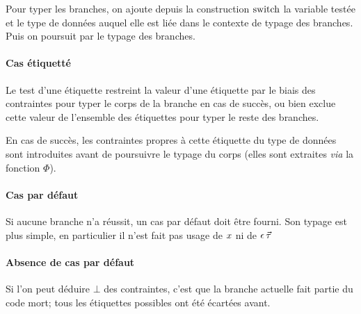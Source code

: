 \begin{mathpar}
%



%
\end{mathpar}
%
Pour typer les branches, on ajoute depuis la construction $\kw{switch}$
la variable testée et le type de données auquel elle est liée dans le contexte
de typage des branches. Puis on poursuit par le typage des branches. 

\paragraph{Cas étiquetté} Le test d'une étiquette restreint la valeur
d'une étiquette par le biais des contraintes pour typer le corps de la branche
en cas de succès, ou bien exclue cette valeur de l'ensemble des étiquettes pour
typer le reste des branches.

En cas de succès, les contraintes propres à cette étiquette du type de données
sont introduites avant de poursuivre le typage du corps (elles sont extraites
\emph{via} la fonction $\Phi$).

\paragraph{Cas par défaut} Si aucune branche n'a réussit, un cas par défaut
doit être fourni. Son typage est plus simple, en particulier il n'est fait pas
usage de $\var$ ni de $\dtype$

\paragraph{Absence de cas par défaut} Si l'on peut déduire $\bot$ des
contraintes, c'est que la branche actuelle fait partie du code mort; tous les
étiquettes possibles ont été écartées avant.

